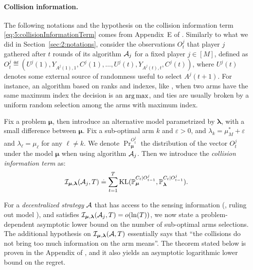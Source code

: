 \paragraph{Collision information.}
%
The following notations and the hypothesis on the collision information term \eqref{eq:5:collisionInformationTerm} comes from Appendix~E of \cite{KaufmannAbbas19}.
Similarly to what we did in Section~\ref{sec:2:notations},
consider the observations $O_t^j$ that player $j$ gathered after $t$ rounds of its algorithm $\mathcal{A}_j$ for a fixed player $j\in[M]$,
defined as $O_t^j \eqdef \left( U^j(1), Y_{A^j(1),1}, C^j(1), \ldots, U^j(t), Y_{A^j(t),t}, C^j(t) \right)$,
where $U^j(t)$ denotes some external source of randomness useful to select $A^j(t+1)$.
For instance, an algorithm based on ranks and \UCB{} indexes, like \RhoRand, when two arms have the same maximum index the decision is an $\operatorname*{arg\,max}$, and ties are usually broken by a uniform random selection among the arms with maximum index.

Fix a problem $\bm{\mu}$,
then introduce an alternative model parametrized by $\bm{\lambda}$, with a small difference between $\bm{\mu}$.
Fix a sub-optimal arm $k$ and $\varepsilon>0$, and $\lambda_k = \mu^*_M + \varepsilon$ and $\lambda_{\ell} = \mu_{\ell}$ for any $\ell\neq k$.
We denote $\Pr_{\bm{\mu}}^{O_t^j}$ the distribution of the vector $O_t^j$ under the model $\bm{\mu}$ when using algorithm $\mathcal{A}_j$.
Then we introduce the \emph{collision information term} as:
\begin{equation}\label{eq:5:collisionInformationTerm}
  \mathcal{I}_{\bm{\mu},\bm{\lambda}}(\mathcal{A}_j,T) \overset{.}{=} \sum_{t=1}^{T} \mathrm{KL}(\mathbb{P}_{\bm{\mu}}^{C_t | O_{t-1}^j}, \mathbb{P}_{\bm{\lambda}}^{C_t | O_{t-1}^j}).
\end{equation}

For a \emph{decentralized strategy} $\mathcal{A}$ that has access to the sensing information (\ie, ruling out model \modeltrois), and satisfies $\mathcal{I}_{\bm{\mu},\bm{\lambda}}(\mathcal{A}_j,T) = \mathop{}\mathopen{}o\mathopen{}\left(\ln(T)\right)$,
we now state a problem-dependent asymptotic lower bound on the number of sub-optimal arms selections.
The additional hypothesis on $\mathcal{I}_{\bm{\mu},\bm{\lambda}}(\mathcal{A},T)$ essentially says that ``the collisions do not bring too much information on the arm means''.
The theorem stated below is proven in the Appendix of \cite{Besson2018ALT},
and it also yields an asymptotic logarithmic lower bound on the regret.

